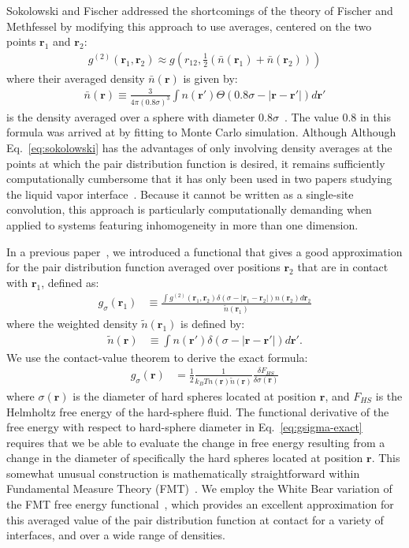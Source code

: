 \documentclass[letterpaper,twocolumn,amsmath,amssymb,pre,aps,10pt]{revtex4-1}
\newcommand{\rr}{\textbf{r}}
\begin{document}
Sokolowski and Fischer addressed the shortcomings of the theory of
Fischer and Methfessel by modifying this approach to use
averages, centered on the two points $\rr_1$ and $\rr_2$:
\begin{align}
  g^{(2)}(\rr_1,\rr_2) \approx g\left(r_{12},
  \tfrac12(\bar{n}(\rr_1)+\bar{n}(\rr_2))\right)
  \label{eq:sokolowski}
\end{align}
where their averaged density $\bar{n}(\rr)$ is given by:
\begin{align}
  \bar{n}(\rr) \equiv \frac{3}{4\pi (0.8\sigma)^3}\int n(\rr')\Theta(0.8\sigma - |\rr-\rr'|) d\rr'
\end{align}
is the density averaged over a sphere with diameter
$0.8\sigma$~\cite{sokolowski1992role}.  The value 0.8 in this formula
was arrived at by fitting to Monte Carlo simulation.  Although
Although Eq.~\ref{eq:sokolowski} has the advantages of only involving
density averages at the points at which the pair distribution function
is desired, it remains sufficiently computationally cumbersome that it
has only been used in two papers studying the liquid vapor
interface~\cite{wadewitz2000application, winkelmann2001liquid}.
Because it cannot be written as a single-site convolution, this
approach is particularly computationally demanding when applied to
systems featuring inhomogeneity in more than one dimension.

In a previous paper~\cite{schulte2012using}, we introduced a
functional that gives a good approximation for the pair distribution
function averaged over positions $\rr_2$ that are in contact with
$\rr_1$, defined as:
\begin{align}
  g_\sigma(\rr_1) &\equiv \frac{ \int g^{(2)}(\rr_1,\rr_2) \delta(\sigma -|\rr_1-\rr_2|)n(\rr_2)
    d\rr_2 }{ \tilde{n}(\rr_1)  }
\end{align}
where the weighted density $\tilde{n}(\rr_1)$ is defined by:
\begin{align}
  \tilde{n}(\rr) &\equiv \int n(\rr') \delta(\sigma -|\rr - \rr'|)d\rr'.
\end{align}
We use the contact-value theorem to derive the exact formula:
\begin{align}
  g_\sigma(\rr)%
  &= \frac12 \frac{1}{k_BT n(\rr) \tilde{n}(\rr)} \frac{\delta
    F_{HS}}{\delta \sigma(\mathbf{r})} \label{eq:gsigma-exact}
\end{align}
where $\sigma(\rr)$ is the diameter of hard spheres located at
position $\rr$, and $F_{HS}$ is the Helmholtz free energy of the
hard-sphere fluid.  The functional derivative of the free energy with
respect to hard-sphere diameter in Eq.~\ref{eq:gsigma-exact} requires
that we be able to evaluate the change in free energy resulting from a
change in the diameter of specifically the hard spheres located at
position $\rr$.  This somewhat unusual construction is mathematically
straightforward within Fundamental Measure Theory
(FMT)~\cite{rosenfeld1989free}.  We employ the White Bear variation of
the FMT free energy functional~\cite{roth2002whitebear}, which
provides an excellent approximation for this averaged value of the
pair distribution function at contact for a variety of interfaces, and
over a wide range of densities.
\end{document}
